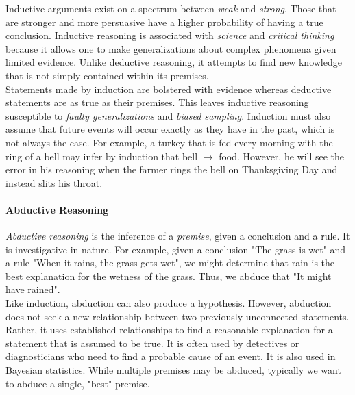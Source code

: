 
Inductive arguments exist on a spectrum between \textit{weak} and \textit{strong}. Those that are stronger and more persuasive have a higher probability of having a true conclusion. Inductive reasoning is associated with \textit{science} and \textit{critical thinking} because it allows one to make generalizations about complex phenomena given limited evidence. Unlike deductive reasoning, it attempts to find new knowledge that is not simply contained within its premises. \\

Statements made by induction are bolstered with evidence whereas deductive statements are as true as their premises. This leaves inductive reasoning susceptible to \textit{faulty generalizations} and \textit{biased sampling}. Induction must also assume that future events will occur exactly as they have in the past, which is not always the case. For example, a turkey that is fed every morning with the ring of a bell may infer by induction that bell $\rightarrow$ food. However, he will see the error in his reasoning when the farmer rings the bell on Thanksgiving Day and instead slits his throat. \\

\paragraph{Abductive Reasoning} \hspace*{1mm} \vspace*{2mm}

\textit{Abductive reasoning} is the inference of a \textit{premise}, given a conclusion and a rule. It is investigative in nature. For example, given a conclusion "The grass is wet" and a rule "When it rains, the grass gets wet", we might determine that rain is the best explanation for the wetness of the grass. Thus, we abduce that "It might have rained". \\

Like induction, abduction can also produce a hypothesis. However, abduction does not seek a new relationship between two previously unconnected statements. Rather, it uses established relationships to find a reasonable explanation for a statement that is assumed to be true. It is often used by detectives or diagnosticians who need to find a probable cause of an event. It is also used in Bayesian statistics. While multiple premises may be abduced, typically we want to abduce a single, "best" premise. \\


